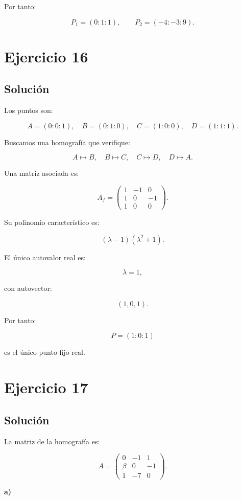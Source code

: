 \documentclass[11pt,a4paper]{article}
\begin{document}
Por tanto:

\[
\boxed{
P_1=(0:1:1),
\qquad
P_2=(-4:-3:9).
}
\]

\section{Ejercicio 16}
\subsection{Solución}

Los puntos son:

\[
A=(0:0:1),
\quad
B=(0:1:0),
\quad
C=(1:0:0),
\quad
D=(1:1:1).
\]

Buscamos una homografía que verifique:

\[
A\mapsto B,
\quad
B\mapsto C,
\quad
C\mapsto D,
\quad
D\mapsto A.
\]

Una matriz asociada es:

\[
\boxed{
A_f=
\begin{pmatrix}
1&-1&0\\
1&0&-1\\
1&0&0
\end{pmatrix}.
}
\]

Su polinomio característico es:

\[
(\lambda-1)(\lambda^2+1).
\]

El único autovalor real es:

\[
\lambda=1,
\]

con autovector:

\[
(1,0,1).
\]

Por tanto:

\[
\boxed{
P=(1:0:1)
}
\]

es el único punto fijo real.

\section{Ejercicio 17}
\subsection{Solución}

La matriz de la homografía es:

\[
A=
\begin{pmatrix}
0&-1&1\\
\beta&0&-1\\
1&-7&0
\end{pmatrix}.
\]

\textbf{a)}
\end{document}

